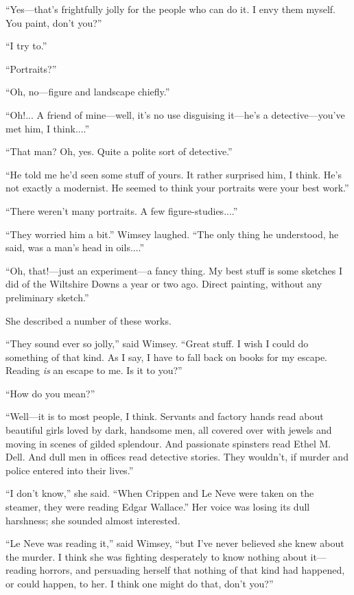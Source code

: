 \enquote{Yes\allowbreak---\allowbreak that's frightfully jolly for the people who can do it. I envy them myself. You paint, don't you?}

\enquote{I try to.}

\enquote{Portraits?}

\enquote{Oh, no\allowbreak---\allowbreak figure and landscape chiefly.}

\enquote{Oh!... A friend of mine\allowbreak---\allowbreak well, it's no use disguising it\allowbreak---\allowbreak he's a detective\allowbreak---\allowbreak you've met him, I think....}

\enquote{That man? Oh, yes. Quite a polite sort of detective.}

\enquote{He told me he'd seen some stuff of yours. It rather surprised him, I think. He's not exactly a modernist. He seemed to think your portraits were your best work.}

\enquote{There weren't many portraits. A few figure-studies....}

\enquote{They worried him a bit.} Wimsey laughed. \enquote{The only thing he understood, he said, was a man's head in oils....}

\enquote{Oh, that!---just an experiment\allowbreak---\allowbreak a fancy thing. My best stuff is some sketches I did of the Wiltshire Downs a year or two ago. Direct painting, without any preliminary sketch.}

She described a number of these works.

\enquote{They sound ever so jolly,} said Wimsey. \enquote{Great stuff. I wish I could do something of that kind. As I say, I have to fall back on books for my escape. Reading \textit{is} an escape to me. Is it to you?}

\enquote{How do you mean?}

\enquote{Well\allowbreak---\allowbreak it is to most people, I think. Servants and factory hands read about beautiful girls loved by dark, handsome men, all covered over with jewels and moving in scenes of gilded splendour. And passionate spinsters read Ethel M. Dell. And dull men in offices read detective stories. They wouldn't, if murder and police entered into their lives.}

\enquote{I don't know,} she said. \enquote{When Crippen and Le Neve were taken on the steamer, they were reading Edgar Wallace.} Her voice was losing its dull harshness; she sounded almost interested.

\enquote{Le Neve was reading it,} said Wimsey, \enquote{but I've never believed she knew about the murder. I think she was fighting desperately to know nothing about it\allowbreak---\allowbreak reading horrors, and persuading herself that nothing of that kind had happened, or could happen, to her. I think one might do that, don't you?}

